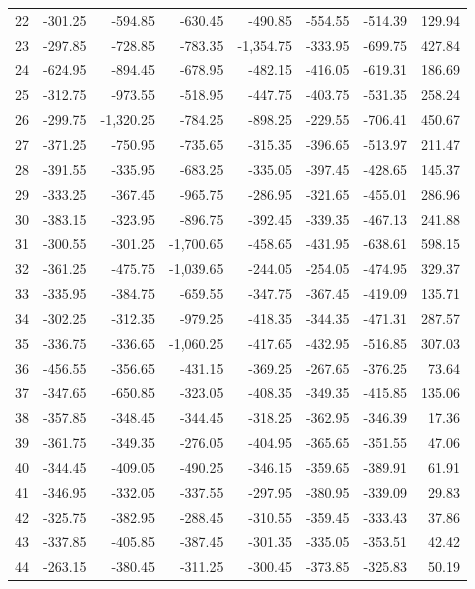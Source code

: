 \begin{longtable}{rrrrrrrr}
22 & -301.25 & -594.85 & -630.45 & -490.85 & -554.55 & -514.39 & 129.94  \\
23 & -297.85 & -728.85 & -783.35 & -1,354.75 & -333.95 & -699.75 & 427.84  \\
24 & -624.95 & -894.45 & -678.95 & -482.15 & -416.05 & -619.31 & 186.69  \\
25 & -312.75 & -973.55 & -518.95 & -447.75 & -403.75 & -531.35 & 258.24  \\
26 & -299.75 & -1,320.25 & -784.25 & -898.25 & -229.55 & -706.41 & 450.67  \\
27 & -371.25 & -750.95 & -735.65 & -315.35 & -396.65 & -513.97 & 211.47  \\
28 & -391.55 & -335.95 & -683.25 & -335.05 & -397.45 & -428.65 & 145.37  \\
29 & -333.25 & -367.45 & -965.75 & -286.95 & -321.65 & -455.01 & 286.96  \\
30 & -383.15 & -323.95 & -896.75 & -392.45 & -339.35 & -467.13 & 241.88  \\
31 & -300.55 & -301.25 & -1,700.65 & -458.65 & -431.95 & -638.61 & 598.15  \\
32 & -361.25 & -475.75 & -1,039.65 & -244.05 & -254.05 & -474.95 & 329.37  \\
33 & -335.95 & -384.75 & -659.55 & -347.75 & -367.45 & -419.09 & 135.71  \\
34 & -302.25 & -312.35 & -979.25 & -418.35 & -344.35 & -471.31 & 287.57  \\
35 & -336.75 & -336.65 & -1,060.25 & -417.65 & -432.95 & -516.85 & 307.03  \\
36 & -456.55 & -356.65 & -431.15 & -369.25 & -267.65 & -376.25 & 73.64  \\
37 & -347.65 & -650.85 & -323.05 & -408.35 & -349.35 & -415.85 & 135.06  \\
38 & -357.85 & -348.45 & -344.45 & -318.25 & -362.95 & -346.39 & 17.36  \\
39 & -361.75 & -349.35 & -276.05 & -404.95 & -365.65 & -351.55 & 47.06  \\
40 & -344.45 & -409.05 & -490.25 & -346.15 & -359.65 & -389.91 & 61.91  \\
41 & -346.95 & -332.05 & -337.55 & -297.95 & -380.95 & -339.09 & 29.83  \\
42 & -325.75 & -382.95 & -288.45 & -310.55 & -359.45 & -333.43 & 37.86  \\
43 & -337.85 & -405.85 & -387.45 & -301.35 & -335.05 & -353.51 & 42.42  \\
44 & -263.15 & -380.45 & -311.25 & -300.45 & -373.85 & -325.83 & 50.19  \\

\end{longtable}
